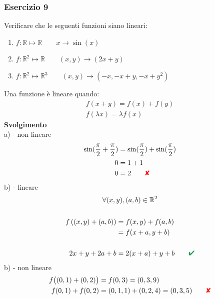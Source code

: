 \documentclass[italian]{article}
\newcommand{\crossmark}{\textcolor{red}{\text{$\qquad$\ding{56}}}}
\renewcommand{\checkmark}{\textcolor{ForestGreen}{\text{$\qquad$\ding{52}}}}
\newcommand{\ins}[1]{\text{$\mathbb{#1}$}}
\begin{document}
\subsubsection{Esercizio 9}
Verificare che le seguenti funzioni siano lineari:
\begin{enumerate}[label=\alph*)]
	\item $f: \ins{R} \longmapsto \ins{R} \qquad x \to \sin(x)$
	\item $f: \ins{R}^2 \longmapsto \ins{R} \qquad (x,y) \to (2x+y)$
	\item $f: \ins{R}^2 \longmapsto \ins{R}^3 \qquad (x,y) \to (-x,-x+y,-x+y^2)$
\end{enumerate}
Una funzione è lineare quando:
\begin{gather*}
	f(x+y)= f(x) + f(y) \\
	f(\lambda x) = \lambda f(x)
\end{gather*}
\textbf{Svolgimento}\\
a) - non lineare
\begin{gather*}
	\begin{split}
		\sin(\frac{\pi}{2} + \frac{\pi}{2}) &= \sin(\frac{\pi}{2}) + \sin(\frac{\pi}{2}) \\
		0 &= 1 + 1 \\
		0 &= 2 \crossmark
	\end{split}
\end{gather*}
b) - lineare
\begin{gather*}
	\forall (x,y),(a,b) \in \ins{R}^2\\\\
	\begin{split}
		f\left((x,y) + (a,b) \right) &= f(x,y) + f(a,b) \\
		&= f(x+a, y+b) \\\\
		2x + y + 2a + b &= 2(x+a) + y + b \checkmark
	\end{split}
\end{gather*}
b) - non lineare
\begin{gather*}
	\begin{split}
		f\bigr((0,1) + (0,2)\bigr) &= f(0,3) = (0,3,9) \\
		f(0,1) + f(0,2) &= (0,1,1) + (0,2,4) = (0,3,5) \crossmark
	\end{split}
\end{gather*}

\newpage
\end{document}
